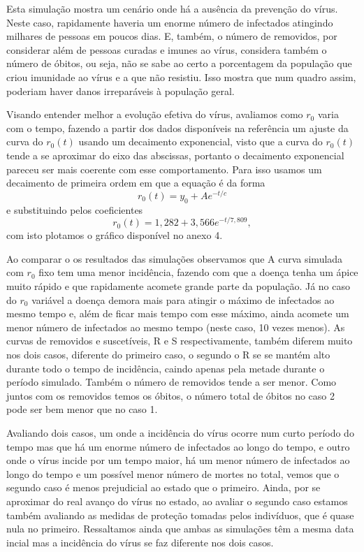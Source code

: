 \documentclass[11pt, a4paper]{article}
\begin{document}
Esta simulação mostra um cenário onde há a ausência da prevenção do vírus.
Neste caso, rapidamente haveria um enorme número de infectados atingindo milhares de pessoas em poucos dias.
E, também, o número de removidos, por considerar além de pessoas curadas e imunes ao vírus, considera também o número de óbitos, ou seja, não se sabe ao certo a porcentagem da população que criou imunidade ao vírus e a que não resistiu.
Isso mostra que num quadro assim, poderiam haver danos irreparáveis à população geral.

Visando entender melhor a evolução efetiva do vírus, avaliamos como $r_0$ varia com o tempo,
fazendo a partir dos dados disponíveis na referência \cite{painel_covid}
um ajuste da curva do $r_0(t)$ usando um decaimento exponencial, visto que a curva do $r_0(t)$
tende a se aproximar do eixo das abscissas, portanto o decaimento exponencial pareceu ser mais coerente com esse comportamento.
Para isso usamos um decaimento de primeira ordem em que a equação é da forma
\[
	r_0(t) = y_0 + A e^{-t/c}
\]
e substituindo pelos coeficientes
\[
	r_0(t) = 1,282 + 3,566 e^{-t/7,809},
\]
com isto plotamos o gráfico disponível no anexo 4.

Ao comparar o os resultados das simulações observamos que A curva simulada com $r_0$
fixo tem uma menor incidência, fazendo com que a doença tenha um ápice muito rápido e que rapidamente acomete grande parte da população.
Já no caso do $r_0$ variável a doença demora mais para atingir o máximo de infectados ao mesmo tempo e, além de ficar mais tempo com esse máximo, ainda acomete um menor número de infectados ao mesmo tempo (neste caso, 10 vezes menos).
As curvas de removidos e suscetíveis, R e S respectivamente, também diferem muito nos dois casos, diferente do primeiro caso, o segundo o R se se mantém alto durante todo o tempo de incidência, caindo apenas pela metade durante o período simulado.
Também o número de removidos tende a ser menor.
Como juntos com os removidos temos os óbitos, o número total de óbitos no caso 2 pode ser bem menor que no caso 1.

Avaliando dois casos, um onde a incidência do vírus ocorre num curto período do tempo mas que há um enorme número de infectados ao longo do tempo, e outro onde o vírus incide por um tempo maior, há um menor número de infectados ao longo do tempo e um possível menor número de mortes no total, vemos que o segundo caso é menos prejudicial ao estado que o primeiro.
Ainda, por se aproximar do real avanço do vírus no estado, ao avaliar o segundo caso estamos também avaliando as medidas de proteção tomadas pelos indivíduos, que é quase nula no primeiro.
Ressaltamos ainda que ambas as simulações têm a mesma data incial mas a incidência do vírus se faz diferente nos dois casos.
\end{document}

